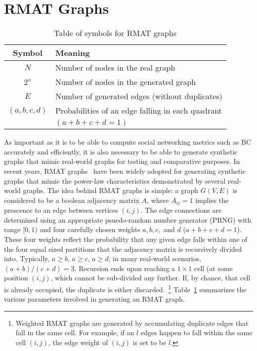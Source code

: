 \section{RMAT Graphs}
\label{sec:rmat}
\begin{table}
\begin{center}
\begin{tabular}{|c|l|}  \hline
Symbol & Meaning \\ \hline
$N$ & Number of nodes in the real graph \\ \hline
$2^n$ & Number of nodes in the generated graph \\ \hline
$E$ & Number of generated edges (without duplicates) \\ \hline
$(a,b,c,d)$ & Probabilities of an edge falling in each quadrant \\ 
 & $(a+b+c+d=1)$ \\ \hline
\end{tabular}
\caption{Table of symbols for RMAT graphs}
\label{tbl:rmat}
\end{center}
\end{table}
%
As important as it is to be able to compute social networking metrics such as
BC accurately and efficiently, it is also necessary to be able to generate
synthetic graphs that mimic real-world graphs for testing and comparative
purposes.
%
In recent years, RMAT graphs~\cite{Chakrabarti04:Recursive} have been widely
adopted for generating synthetic graphs that mimic the power-law
characteristics demonstrated by several real-world graphs.
%
The idea behind RMAT graphs is simple: a graph $G(V,E)$ is considered to be 
a boolean adjacency matrix $A$, where $A_{ij}=1$ implies the prescence to an 
edge between vertices $(i,j)$.
%
The edge connections are determined using an appropriate psuedo-random number 
generator (PRNG) with range $[0,1)$ and four carefully chosen weights $a,b,c,$
and $d$ ($a+b+c+d=1$).
%
These four weights reflect the probability that any given edge falls within one
of the four equal sized partitions that the adjacency matrix is recursively
divided into.
%
Typically, $a\ge{}b$, $a\ge{}c$, $a\ge{}d$; in many real-world scenarios,
$(a+b)/(c+d)=3$.
%
Recursion ends upon reaching a $1\times{}1$ cell (at some position $(i,j)$,
which cannot be sub-divided any further.
%
If, by chance, that cell is already occupied, the duplicate is either
discarded.~\footnote{Weighted RMAT graphs are generated by accumulating
duplicate edges that fall in the same cell. For example, if an $l$ edges happen
to fall within the same cell $(i,j)$, the edge weight of $(i,j)$ is set to be
$l$.}
%
Table~\ref{tbl:rmat} summarizes the various parameters involved in generating 
an RMAT graph.
